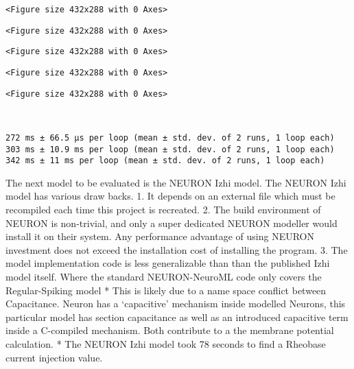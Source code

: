 \documentclass[11pt]{article}
\begin{document}
    
    
    \begin{verbatim}
<Figure size 432x288 with 0 Axes>
    \end{verbatim}

    
    
    \begin{verbatim}
<Figure size 432x288 with 0 Axes>
    \end{verbatim}

    
    
    \begin{verbatim}
<Figure size 432x288 with 0 Axes>
    \end{verbatim}

    
    
    \begin{verbatim}
<Figure size 432x288 with 0 Axes>
    \end{verbatim}

    
    
    \begin{verbatim}
<Figure size 432x288 with 0 Axes>
    \end{verbatim}

    
    \begin{center}
    \end{center}
    { \hspace*{\fill} \\}
    
    \begin{Verbatim}[commandchars=\\\{\}]
272 ms ± 66.5 µs per loop (mean ± std. dev. of 2 runs, 1 loop each)
303 ms ± 10.9 ms per loop (mean ± std. dev. of 2 runs, 1 loop each)
342 ms ± 11 ms per loop (mean ± std. dev. of 2 runs, 1 loop each)
    \end{Verbatim}

    The next model to be evaluated is the NEURON Izhi model. The NEURON Izhi
model has various draw backs. 1. It depends on an external file which
must be recompiled each time this project is recreated. 2. The build
environment of NEURON is non-trivial, and only a super dedicated NEURON
modeller would install it on their system. Any performance advantage of
using NEURON investment does not exceed the installation cost of
installing the program. 3. The model implementation code is less
generalizable than than the published Izhi model itself. Where the
standard NEURON-NeuroML code only covers the Regular-Spiking model *
This is likely due to a name space conflict between Capacitance. Neuron
has a `capacitive' mechanism inside modelled Neurons, this particular
model has section capacitance as well as an introduced capacitive term
inside a C-compiled mechanism. Both contribute to a the membrane
potential calculation. * The NEURON Izhi model took 78 seconds to find a
Rheobase current injection value.
\end{document}
